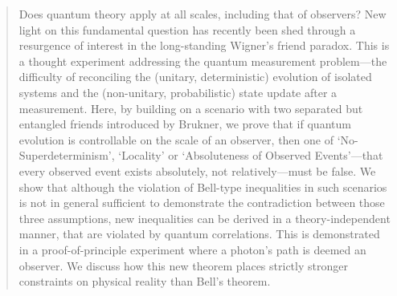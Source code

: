 \documentclass[aps,prx,twocolumn,superscriptaddress]{revtex4-1}
\theoremstyle{plain}
\begin{document}
\begin{abstract}
{Does quantum theory apply at all scales, including that of observers? New light on this fundamental question has recently been shed through a resurgence of interest in the long-standing Wigner’s friend paradox. This is a thought experiment addressing the quantum measurement problem---the difficulty of reconciling the (unitary, deterministic) evolution of isolated systems and the (non-unitary, probabilistic) state update after a measurement. Here, by building on a scenario with two separated but entangled friends introduced by Brukner, we prove that if quantum evolution is controllable on the scale of an observer, then one of `No-Superdeterminism', `Locality' or `Absoluteness of Observed Events'---that every observed event exists absolutely, not relatively---must be false. We show that although the violation of Bell-type inequalities in such scenarios is not in general sufficient to demonstrate the contradiction between those three assumptions, new inequalities can be derived in a theory-independent manner, that are violated by quantum correlations. This is demonstrated in a proof-of-principle experiment where a photon’s path is deemed an observer. We discuss how this new theorem places strictly stronger constraints on physical reality than Bell’s theorem.}
\end{abstract}
\maketitle
\end{document}
